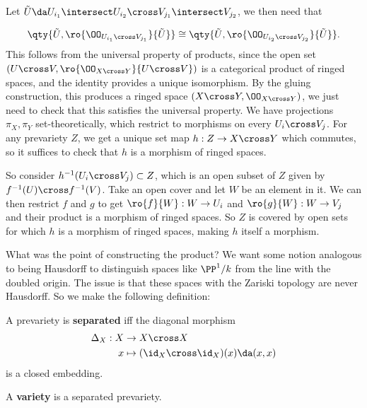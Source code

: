 Let
\(\tilde U \da U_{i_1} \intersect U_{i_2} \cross V_{j_1} \intersect V_{j_2}\),
we then need that

\begin{align*}  
\qty{ \tilde U, \ro{ \OO_{U_{i_1} \cross V_{j_1}} }{\tilde U} } \cong
\qty{ \tilde U, \ro{ \OO_{U_{i_2} \cross V_{j_2}} }{\tilde U} }
.\end{align*} This follows from the universal property of products,
since the open set \((U\cross V, \ro{ \OO_{X\cross Y} }{U\cross V} )\)
is a categorical product of ringed spaces, and the identity provides a
unique isomorphism. By the gluing construction, this produces a ringed
space \((X\cross Y, \OO_{X\cross Y})\), we just need to check that this
satisfies the universal property. We have projections \(\pi_X, \pi_Y\)
set-theoretically, which restrict to morphisms on every
\(U_i \cross V_j\). For any prevariety \(Z\), we get a unique set map
\(h:Z\to X\cross Y\) which commutes, so it suffices to check that \(h\)
is a morphism of ringed spaces.

So consider \(h^{-1} (U_i \cross V_j) \subset Z\), which is an open
subset of \(Z\) given by \(f^{-1}(U) \cross f^{-1}(V)\). Take an open
cover and let \(W\) be an element in it. We can then restrict \(f\) and
\(g\) to get \(\ro{f}{W}:W\to U_i\) and \(\ro{g}{W}:W\to V_j\) and their
product is a morphism of ringed spaces. So \(Z\) is covered by open sets
for which \(h\) is a morphism of ringed spaces, making \(h\) itself a
morphism.

What was the point of constructing the product? We want some notion
analogous to being Hausdorff to distinguish spaces like \(\PP^1/k\) from
the line with the doubled origin. The issue is that these spaces with
the Zariski topology are never Hausdorff. So we make the following
definition:

\begin{definition}[Separated]

A prevariety is \textbf{separated} iff the diagonal morphism
\begin{align*}  
\Delta_X: X &\to X\cross X \\
x &\mapsto (\id_X \cross \id_X)(x) \da (x, x)
\end{align*} is a closed embedding.

\end{definition}

\begin{definition}[Variety]

A \textbf{variety} is a separated prevariety.

\end{definition}

